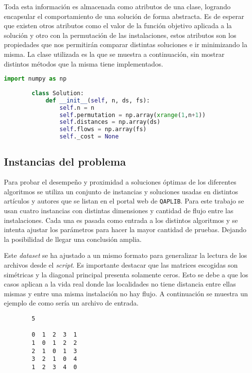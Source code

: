 Toda esta información es almacenada como atributos de una clase, logrando encapsular el comportamiento de una solución de forma abstracta. Es de esperar que existen otros atributos como el valor de la función objetivo aplicada a la solución y otro con la permutación de las instalaciones, estos atributos son los propiedades que nos permitirán comparar distintas soluciones e ir minimizando la misma. La clase utilizada es la que se muestra a continuación, sin mostrar distintos métodos que la misma tiene implementados.

\begin{lstlisting}[language=Python]
        import numpy as np
         
        class Solution:
            def __init__(self, n, ds, fs):
                self.n = n
                self.permutation = np.array(xrange(1,n+1))
                self.distances = np.array(ds)
                self.flows = np.array(fs)
                self._cost = None
\end{lstlisting}

\subsection*{Instancias del problema}

Para probar el desempeño y proximidad a soluciones óptimas de los diferentes algoritmos se utiliza un conjunto de instancias y soluciones usadas en distintos artículos y autores que se listan en el portal web de \texttt{QAPLIB}\cite{web:qaplib}. Para este trabajo se usan cuatro instancias con distintas dimensiones y cantidad de flujo entre las instalaciones. Cada una es pasada como entrada a los distintos algoritmos y se intenta ajustar los parámetros para hacer la mayor cantidad de pruebas. Dejando la posibilidad de llegar una conclusión amplia.

Este \textit{dataset} se ha ajustado a un mismo formato para generalizar la lectura de los archivos desde el \textit{script}. Es importante destacar que las matrices escogidas son simétricas y la diagonal principal presenta solamente ceros. Esto se debe a que los casos aplican a la vida real donde las localidades no tiene distancia entre ellas mismas y entre una misma instalación no hay flujo. A continuación se muestra un ejemplo de como sería un archivo de entrada.

\begin{lstlisting}
        5

        0  1  2  3  1
        1  0  1  2  2
        2  1  0  1  3
        3  2  1  0  4
        1  2  3  4  0
\end{lstlisting}

